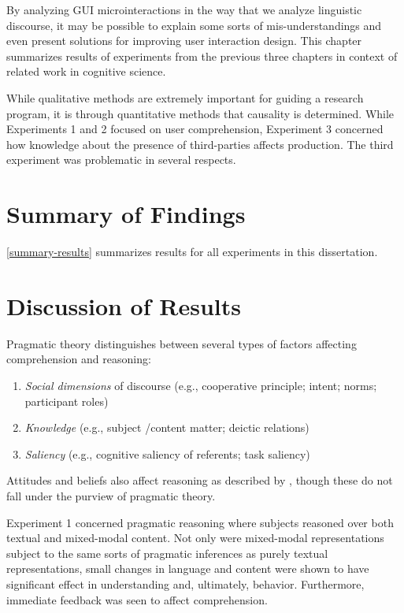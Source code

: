 By analyzing GUI microinteractions in the way that we analyze linguistic discourse, it may be possible to explain some sorts of mis-understandings and even present solutions for improving user interaction design. This chapter summarizes results of experiments from the previous three chapters in context of related work in cognitive science.

While qualitative methods are extremely important for guiding a research program, it is through quantitative methods that causality is determined. While Experiments 1 and 2 focused on user comprehension, Experiment 3 concerned how knowledge about the presence of third-parties affects production. The third experiment was problematic in several respects.

\section{Summary of Findings}
\label{summaryoffindings}

 \autoref{summary-results}  summarizes results for all experiments in this dissertation.





\section{Discussion of Results}
\label{discussionofresults}

Pragmatic theory distinguishes between several types of factors affecting comprehension and reasoning:

\begin{enumerate}
\item \emph{Social dimensions} of discourse (e.g., cooperative principle; intent; norms; participant roles)

\item \emph{Knowledge} (e.g., subject \slash  content matter; deictic relations)

\item \emph{Saliency} (e.g., cognitive saliency of referents; task saliency)

\end{enumerate}

Attitudes and beliefs also affect reasoning as described by  \citet{Kahneman:1984td},  though these do not fall under the purview of pragmatic theory.

Experiment 1 concerned pragmatic reasoning where subjects reasoned over both textual and mixed-modal content. Not only were mixed-modal representations subject to the same sorts of pragmatic inferences as purely textual representations, small changes in language and content were shown to have significant effect in understanding and, ultimately, behavior. Furthermore, immediate feedback was seen to affect comprehension. 

